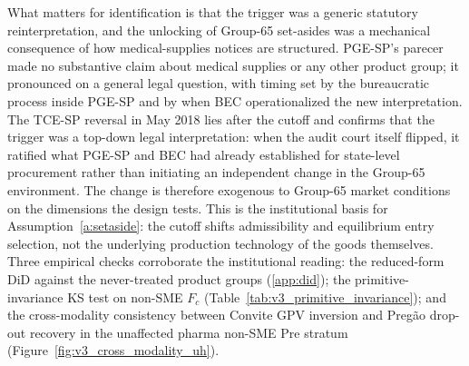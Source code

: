 What matters for identification is that the trigger was a generic statutory reinterpretation, and the unlocking of Group-65 set-asides was a mechanical consequence of how medical-supplies notices are structured. PGE-SP's parecer made no substantive claim about medical supplies or any other product group; it pronounced on a general legal question, with timing set by the bureaucratic process inside PGE-SP and by when BEC operationalized the new interpretation. The TCE-SP reversal in May 2018 lies after the cutoff and confirms that the trigger was a top-down legal interpretation: when the audit court itself flipped, it ratified what PGE-SP and BEC had already established for state-level procurement rather than initiating an independent change in the Group-65 environment. The change is therefore exogenous to Group-65 market conditions on the dimensions the design tests. This is the institutional basis for Assumption~\ref{a:setaside}: the cutoff shifts admissibility and equilibrium entry selection, not the underlying production technology of the goods themselves. Three empirical checks corroborate the institutional reading: the reduced-form DiD against the \controlGroupCount{} never-treated product groups (\ref{app:did}); the primitive-invariance KS test on non-SME $F_c$ (Table~\ref{tab:v3_primitive_invariance}); and the cross-modality consistency between Convite GPV inversion and Preg\~ao drop-out recovery in the unaffected pharma non-SME Pre stratum (Figure~\ref{fig:v3_cross_modality_uh}).

